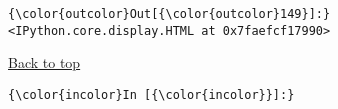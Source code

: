 \documentclass{article}
\begin{document}
            \begin{Verbatim}[commandchars=\\\{\}]
{\color{outcolor}Out[{\color{outcolor}149}]:} <IPython.core.display.HTML at 0x7faefcf17990>
\end{Verbatim}
        
    \hyperref[Index]{Back to top}

    \begin{Verbatim}[commandchars=\\\{\}]
{\color{incolor}In [{\color{incolor}}]:} 
\end{Verbatim}


    
    
    
    
\end{document}
